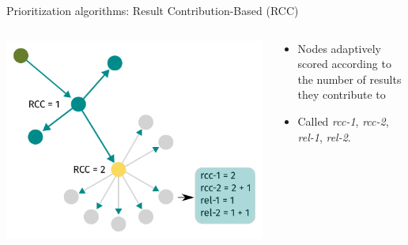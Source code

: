 \begin{frame}{Prioritization algorithms: Result Contribution-Based (RCC)}
    \begin{columns}[T] %
        \begin{column}{0.6\textwidth} %
            \includegraphics[width=\linewidth]{images/rcc-based.pdf} %
        \end{column}

        \begin{column}{0.4\textwidth} %
            \begin{itemize}
                \item Nodes adaptively scored according to the number of results they contribute to
                \item Called \emph{rcc-1}, \emph{rcc-2}, \emph{rel-1}, \emph{rel-2}.
            \end{itemize}
        \end{column}
    \end{columns}
\end{frame}

